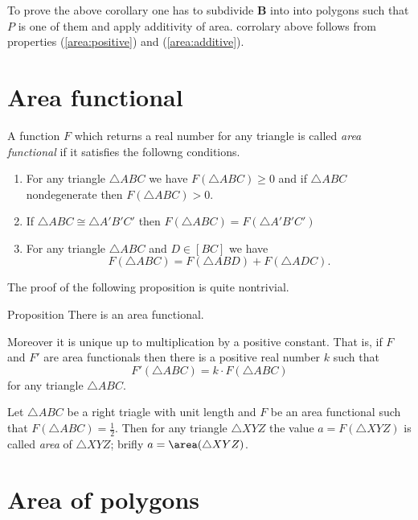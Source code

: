 To prove the above corollary one has to subdivide $\bm{B}$ into into polygons
such that $P$ is one of them and apply additivity of area.
corrolary above 
follows from properties 
(\ref{area:positive}) and (\ref{area:additive}).






\section*{Area functional}

A function $F$ which returns a real number 
for any triangle is called \emph{area functional} if it satisfies the followng conditions.

\begin{enumerate}
\item For any triangle $\triangle ABC$ we have $F(\triangle ABC)\ge 0$ and 
if  $\triangle ABC$ nondegenerate then $F(\triangle ABC)>0$.
\item If $\triangle ABC\cong\triangle A'B'C'$ 
 then $F(\triangle ABC)=F(\triangle A'B'C')$
\item For any triangle $ \triangle ABC$ and $D\in [BC]$ we have
$$F(\triangle ABC)=F(\triangle ABD)+F(\triangle ADC).$$
\end{enumerate}

The proof of the following proposition is quite nontrivial.

\begin{thm}{Proposition}
There is an area functional. 

Moreover it is unique up to multiplication by a positive constant. 
That is, if $F$ and $F'$ are area functionals then there is a positive real number $k$ such that 
\[F'(\triangle ABC)=k\cdot F(\triangle ABC)\]
for any triangle $\triangle ABC$.
\end{thm}

Let $\triangle ABC$ be a right triagle with unit length
and $F$ be an area functional such that $F(\triangle ABC)=\tfrac12$.
Then for any triangle $\triangle XYZ$ the value $a=F(\triangle XYZ)$ is called \emph{area} of $\triangle XYZ$;
brifly $a=\area(\triangle XYZ)$.






\section*{Area of polygons}

